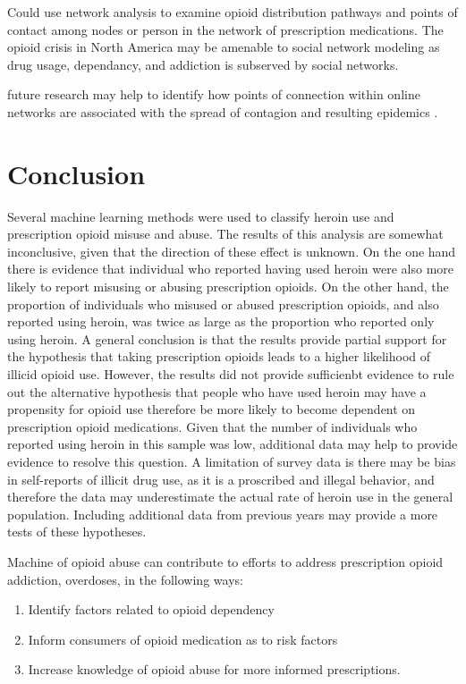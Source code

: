 \documentclass[sigconf]{acmart}
\begin{document}
Could use network analysis to examine opioid distribution pathways and points 
of contact among nodes or person in the network of prescription medications.
The opioid crisis in North America may be amenable to social network modeling as 
drug usage, dependancy, and addiction is subserved by social networks. 

future research may help to identify how points of connection within online
networks are associated with the spread of contagion and resulting epidemics 
\cite{zhu17}. 


\section{Conclusion}

Several machine learning methods were used to classify heroin use and 
prescription opioid misuse and abuse. The results of this analysis are somewhat inconclusive, given that the direction of these effect is unknown. On the one 
hand there is evidence that individual who reported having used heroin were 
also more likely to report misusing or abusing prescription opioids. On the 
other hand, the proportion of individuals who misused or abused prescription 
opioids, and also reported using heroin, was twice as large as the proportion 
who reported only using heroin. A general conclusion is that the results 
provide partial support for the hypothesis that taking prescription opioids
leads to a higher likelihood of illicid opioid use. However, the results did
not provide sufficienbt evidence to rule out the alternative hypothesis that
people who have used heroin may have a propensity for opioid use therefore
be more likely to become dependent on prescription opioid medications. Given
that the number of individuals who reported using heroin in this sample was
low, additional data may help to provide evidence to resolve this question.
A limitation of survey data is there may be bias in self-reports of illicit
drug use, as it is a proscribed and illegal behavior, and therefore the 
data may underestimate the actual rate of heroin use in the general population. 
Including additional data from previous years may provide a more tests of 
these hypotheses. 


Machine of opioid abuse can contribute to efforts to 
address prescription opioid addiction, overdoses, in the following ways: 
\begin{enumerate}
\item Identify factors related to opioid dependency
\item Inform consumers of opioid medication as to risk factors 
\item Increase knowledge of opioid abuse for more informed prescriptions. 
\end{enumerate}
\end{document}
